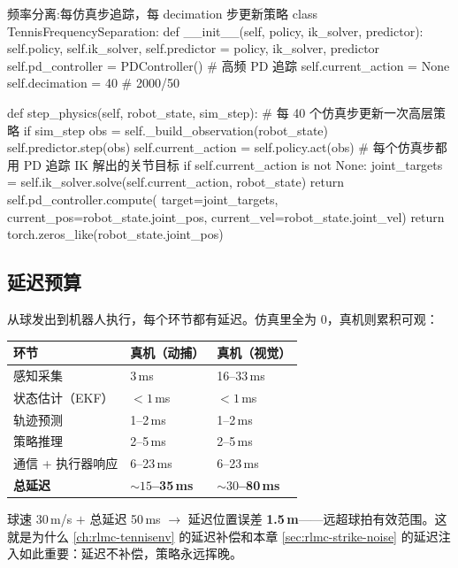 \begin{codebox}[Python]{频率分离:每仿真步追踪，每 decimation 步更新策略}
class TennisFrequencySeparation:
    def __init__(self, policy, ik_solver, predictor):
        self.policy, self.ik_solver, self.predictor = policy, ik_solver, predictor
        self.pd_controller = PDController()       # 高频 PD 追踪
        self.current_action = None
        self.decimation = 40                      # 2000/50

    def step_physics(self, robot_state, sim_step):
        # 每 40 个仿真步更新一次高层策略
        if sim_step %
            obs = self._build_observation(robot_state)
            self.predictor.step(obs)
            self.current_action = self.policy.act(obs)
        # 每个仿真步都用 PD 追踪 IK 解出的关节目标
        if self.current_action is not None:
            joint_targets = self.ik_solver.solve(self.current_action, robot_state)
            return self.pd_controller.compute(
                target=joint_targets,
                current_pos=robot_state.joint_pos,
                current_vel=robot_state.joint_vel)
        return torch.zeros_like(robot_state.joint_pos)
\end{codebox}

\subsection{延迟预算}

从球发出到机器人执行，每个环节都有延迟。仿真里全为 0，真机则累积可观：

\begin{center}
\small
\begin{tabular}{@{}lll@{}}
\toprule
环节 & 真机（动捕） & 真机（视觉） \\
\midrule
感知采集 & 3\,ms & 16--33\,ms \\
状态估计（EKF） & $<1$\,ms & $<1$\,ms \\
轨迹预测 & 1--2\,ms & 1--2\,ms \\
策略推理 & 2--5\,ms & 2--5\,ms \\
通信 + 执行器响应 & 6--23\,ms & 6--23\,ms \\
\textbf{总延迟} & \textbf{$\sim 15$--35\,ms} & \textbf{$\sim 30$--80\,ms} \\
\bottomrule
\end{tabular}
\end{center}

球速 30\,m/s $+$ 总延迟 50\,ms $\to$ 延迟位置误差 \textbf{1.5\,m}——远超球拍有效范围。这就是为什么 \cref{ch:rlmc-tennisenv} 的延迟补偿和本章 \cref{sec:rlmc-strike-noise} 的延迟注入如此重要：延迟不补偿，策略永远挥晚。


